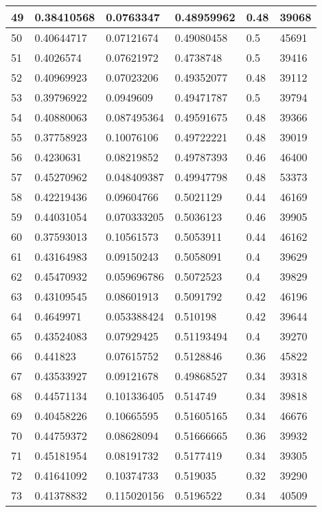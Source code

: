 \begin{longtable}{|l|l|l|l|l|l|}
49 & 0.38410568 & 0.0763347 & 0.48959962 & 0.48 & 39068 \\ \hline 
50 & 0.40644717 & 0.07121674 & 0.49080458 & 0.5 & 45691 \\ \hline 
51 & 0.4026574 & 0.07621972 & 0.4738748 & 0.5 & 39416 \\ \hline 
52 & 0.40969923 & 0.07023206 & 0.49352077 & 0.48 & 39112 \\ \hline 
53 & 0.39796922 & 0.0949609 & 0.49471787 & 0.5 & 39794 \\ \hline 
54 & 0.40880063 & 0.087495364 & 0.49591675 & 0.48 & 39366 \\ \hline 
55 & 0.37758923 & 0.10076106 & 0.49722221 & 0.48 & 39019 \\ \hline 
56 & 0.4230631 & 0.08219852 & 0.49787393 & 0.46 & 46400 \\ \hline 
57 & 0.45270962 & 0.048409387 & 0.49947798 & 0.48 & 53373 \\ \hline 
58 & 0.42219436 & 0.09604766 & 0.5021129 & 0.44 & 46169 \\ \hline 
59 & 0.44031054 & 0.070333205 & 0.5036123 & 0.46 & 39905 \\ \hline 
60 & 0.37593013 & 0.10561573 & 0.5053911 & 0.44 & 46162 \\ \hline 
61 & 0.43164983 & 0.09150243 & 0.5058091 & 0.4 & 39629 \\ \hline 
62 & 0.45470932 & 0.059696786 & 0.5072523 & 0.4 & 39829 \\ \hline 
63 & 0.43109545 & 0.08601913 & 0.5091792 & 0.42 & 46196 \\ \hline 
64 & 0.4649971 & 0.053388424 & 0.510198 & 0.42 & 39644 \\ \hline 
65 & 0.43524083 & 0.07929425 & 0.51193494 & 0.4 & 39270 \\ \hline 
66 & 0.441823 & 0.07615752 & 0.5128846 & 0.36 & 45822 \\ \hline 
67 & 0.43533927 & 0.09121678 & 0.49868527 & 0.34 & 39318 \\ \hline 
68 & 0.44571134 & 0.101336405 & 0.514749 & 0.34 & 39818 \\ \hline 
69 & 0.40458226 & 0.10665595 & 0.51605165 & 0.34 & 46676 \\ \hline 
70 & 0.44759372 & 0.08628094 & 0.51666665 & 0.36 & 39932 \\ \hline 
71 & 0.45181954 & 0.08191732 & 0.5177419 & 0.34 & 39305 \\ \hline 
72 & 0.41641092 & 0.10374733 & 0.519035 & 0.32 & 39290 \\ \hline 
73 & 0.41378832 & 0.115020156 & 0.5196522 & 0.34 & 40509 \\ \hline 

\end{longtable}
